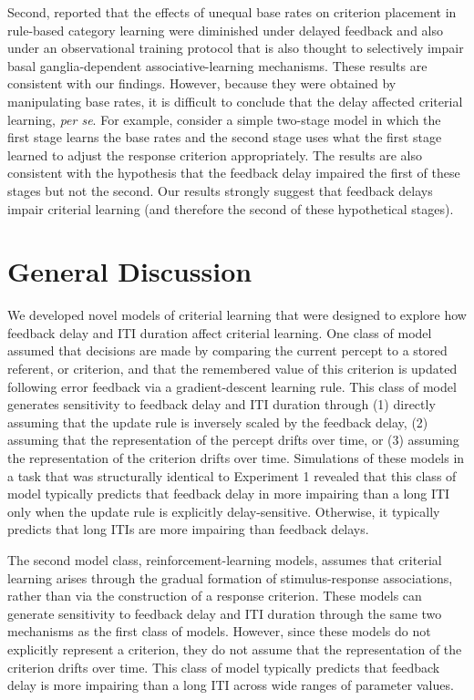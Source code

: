 \documentclass[doc, floatsintext]{apa7}
\begin{document}
Second, \textcite{bohil2014implicit} reported that the
effects of unequal base rates on criterion placement in
rule-based category learning were diminished under delayed
feedback and also under an observational training protocol
that is also thought to selectively impair basal
ganglia-dependent associative-learning mechanisms. These
results are consistent with our findings. However, because
they were obtained by manipulating base rates, it is
difficult to conclude that the delay affected criterial
learning, \emph{per se}. For example, consider a simple
two-stage model in which the first stage learns the base
rates and the second stage uses what the first stage learned
to adjust the response criterion appropriately. The
\textcite{bohil2014implicit} results are also consistent
with the hypothesis that the feedback delay impaired the
first of these stages but not the second. Our results
strongly suggest that feedback delays impair criterial
learning (and therefore the second of these hypothetical
stages).

\section{General Discussion}
We developed novel models of criterial learning that were
designed to explore how feedback delay and ITI duration
affect criterial learning.  One class of model assumed that
decisions are made by comparing the current percept to a
stored referent, or criterion, and that the remembered value
of this criterion is updated following error feedback via a
gradient-descent learning rule.  This class of model
generates sensitivity to feedback delay and ITI duration
through (1) directly assuming that the update rule is
inversely scaled by the feedback delay, (2) assuming that
the representation of the percept drifts over time, or (3)
assuming the representation of the criterion drifts over
time.  Simulations of these models in a task that was
structurally identical to Experiment 1 revealed that this
class of model typically predicts that feedback delay in
more impairing than a long ITI only when the update rule is
explicitly delay-sensitive.  Otherwise, it typically
predicts that long ITIs are more impairing than feedback
delays.

The second model class, reinforcement-learning models,
assumes that criterial learning arises through the gradual
formation of stimulus-response associations, rather than via
the construction of a response criterion.  These models can
generate sensitivity to feedback delay and ITI duration
through the same two mechanisms as the first class of
models. However, since these models do not explicitly
represent a criterion, they do not assume that the
representation of the criterion drifts over time.   This
class of model  typically predicts that feedback delay is
more impairing than a long ITI across wide ranges of
parameter values.
\end{document}
